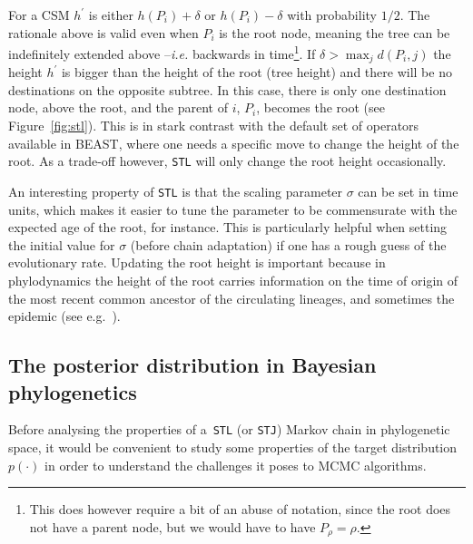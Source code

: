 For a CSM $h^\prime$ is either $h(P_i) + \delta$ or $h(P_i) - \delta$  with probability $1/2$.
The rationale above is valid even when $P_i$ is the root node, meaning the tree can be indefinitely extended above --\textit{i.e.} backwards in time\footnote{This does however require a bit of an abuse of notation, since the root does not have a parent node, but we would have to have $P_\rho = \rho$.}.
If $\delta > \max_{j} d(P_i, j)$ the height $h^\prime$ is bigger than the height of the root (tree height) and there will be no destinations on the opposite subtree.
In this case, there is only one destination node, above the root, and the parent of $i$, $P_i$, becomes the root (see Figure~\ref{fig:stl}).
This is in stark contrast with the default set of operators available in BEAST, where one needs a specific move to change the height of the root.
As a trade-off however, \verb|STL| will only change the root height occasionally.

An interesting property of \verb|STL| is that the scaling parameter $\sigma$ can be set in time units, which makes it easier to tune the parameter to be commensurate with the expected age of the root, for instance.
This is particularly helpful when setting the initial value for $\sigma$ (before chain adaptation) if one has a rough guess of the evolutionary rate.
Updating the root height is important because in phylodynamics the height of the root carries information on the time of origin of the most recent common ancestor of the circulating lineages, and sometimes the epidemic (see e.g.~\cite{Gire2014}).

\subsection{The posterior distribution in Bayesian phylogenetics}
\label{sec:prior_maths}

Before analysing the properties of a~\verb|STL| (or \verb|STJ|) Markov chain in phylogenetic space, it would be convenient to study some properties of the target distribution $p(\cdot)$ in order to understand the challenges it poses to MCMC algorithms.

